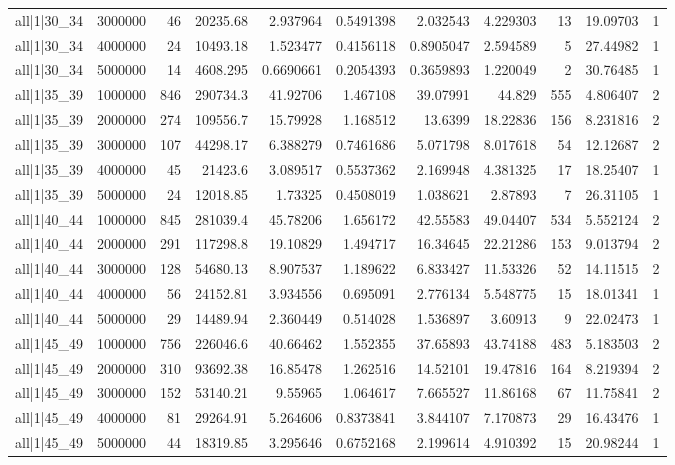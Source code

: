 \begin{tabular}{lrrrrrrrrrr}
all|1|30\_34 & 3000000 & 46 & 20235.68 & 2.937964 & 0.5491398 & 2.032543 & 4.229303 & 13 & 19.09703 & 1 \\
all|1|30\_34 & 4000000 & 24 & 10493.18 & 1.523477 & 0.4156118 & 0.8905047 & 2.594589 & 5 & 27.44982 & 1 \\
all|1|30\_34 & 5000000 & 14 & 4608.295 & 0.6690661 & 0.2054393 & 0.3659893 & 1.220049 & 2 & 30.76485 & 1 \\
all|1|35\_39 & 1000000 & 846 & 290734.3 & 41.92706 & 1.467108 & 39.07991 & 44.829 & 555 & 4.806407 & 2 \\
all|1|35\_39 & 2000000 & 274 & 109556.7 & 15.79928 & 1.168512 & 13.6399 & 18.22836 & 156 & 8.231816 & 2 \\
all|1|35\_39 & 3000000 & 107 & 44298.17 & 6.388279 & 0.7461686 & 5.071798 & 8.017618 & 54 & 12.12687 & 2 \\
all|1|35\_39 & 4000000 & 45 & 21423.6 & 3.089517 & 0.5537362 & 2.169948 & 4.381325 & 17 & 18.25407 & 1 \\
all|1|35\_39 & 5000000 & 24 & 12018.85 & 1.73325 & 0.4508019 & 1.038621 & 2.87893 & 7 & 26.31105 & 1 \\
all|1|40\_44 & 1000000 & 845 & 281039.4 & 45.78206 & 1.656172 & 42.55583 & 49.04407 & 534 & 5.552124 & 2 \\
all|1|40\_44 & 2000000 & 291 & 117298.8 & 19.10829 & 1.494717 & 16.34645 & 22.21286 & 153 & 9.013794 & 2 \\
all|1|40\_44 & 3000000 & 128 & 54680.13 & 8.907537 & 1.189622 & 6.833427 & 11.53326 & 52 & 14.11515 & 2 \\
all|1|40\_44 & 4000000 & 56 & 24152.81 & 3.934556 & 0.695091 & 2.776134 & 5.548775 & 15 & 18.01341 & 1 \\
all|1|40\_44 & 5000000 & 29 & 14489.94 & 2.360449 & 0.514028 & 1.536897 & 3.60913 & 9 & 22.02473 & 1 \\
all|1|45\_49 & 1000000 & 756 & 226046.6 & 40.66462 & 1.552355 & 37.65893 & 43.74188 & 483 & 5.183503 & 2 \\
all|1|45\_49 & 2000000 & 310 & 93692.38 & 16.85478 & 1.262516 & 14.52101 & 19.47816 & 164 & 8.219394 & 2 \\
all|1|45\_49 & 3000000 & 152 & 53140.21 & 9.55965 & 1.064617 & 7.665527 & 11.86168 & 67 & 11.75841 & 2 \\
all|1|45\_49 & 4000000 & 81 & 29264.91 & 5.264606 & 0.8373841 & 3.844107 & 7.170873 & 29 & 16.43476 & 1 \\
all|1|45\_49 & 5000000 & 44 & 18319.85 & 3.295646 & 0.6752168 & 2.199614 & 4.910392 & 15 & 20.98244 & 1 \\

\end{tabular}
